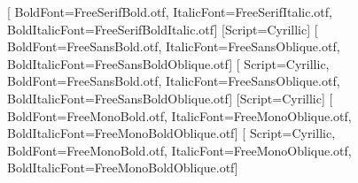 \setdefaultlanguage{russian}

\addto\captionsrussian{
	\renewcommand{\partname}{Глава}
	\renewcommand{\contentsname}{Содержание}
	\renewcommand{\figurename}{Рисунок}
}




\beamertemplatenavigationsymbolsempty

    {\setmainfont{CMU Serif}}
    {
        {\setmainfont{Times New Roman}}
        {\setmainfont{FreeSerif.otf}[
            BoldFont=FreeSerifBold.otf,
            ItalicFont=FreeSerifItalic.otf,
            BoldItalicFont=FreeSerifBoldItalic.otf]}}
    {\setsansfont{Arial}\newfontfamily{}[Script=Cyrillic]}
    {\setsansfont{FreeSans.otf}[
        BoldFont=FreeSansBold.otf,
        ItalicFont=FreeSansOblique.otf,
        BoldItalicFont=FreeSansBoldOblique.otf]
    \newfontfamily{}[
        Script=Cyrillic,
        BoldFont=FreeSansBold.otf,
        ItalicFont=FreeSansOblique.otf,
        BoldItalicFont=FreeSansBoldOblique.otf]}
    {\setmonofont{Courier New}\newfontfamily{}[Script=Cyrillic]}
    {\setmonofont{FreeMono.otf}[
        BoldFont=FreeMonoBold.otf,
        ItalicFont=FreeMonoOblique.otf,
        BoldItalicFont=FreeMonoBoldOblique.otf]
    \newfontfamily{}[
        Script=Cyrillic,
        BoldFont=FreeMonoBold.otf,
        ItalicFont=FreeMonoOblique.otf,
        BoldItalicFont=FreeMonoBoldOblique.otf]}


\graphicspath{{fig/}}

\newcommand{\MExpect}{\mathsf{M}}

\DeclareMathOperator{\sgn}{\mathop{sgn}}
